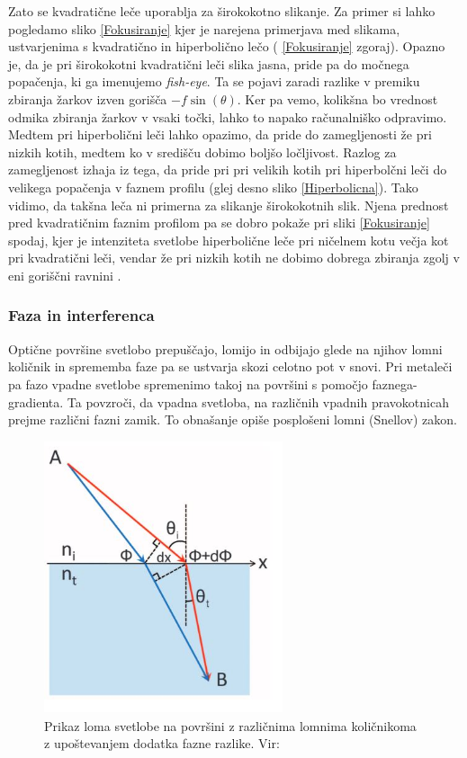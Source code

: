 \documentclass[12pt ]{article}
\begin{document}
Zato se kvadratične leče uporablja za širokokotno slikanje. Za primer si lahko pogledamo sliko \ref{Fokusiranje} kjer je narejena primerjava med slikama, ustvarjenima s kvadratično in hiperbolično lečo ( \ref{Fokusiranje} zgoraj). Opazno je, da je pri širokokotni kvadratični leči slika jasna, pride pa do močnega popačenja, ki ga imenujemo \textit{fish-eye}. Ta se pojavi zaradi razlike v premiku zbiranja žarkov izven gorišča $-f\sin(\theta)$. Ker pa vemo, kolikšna bo vrednost odmika zbiranja žarkov v vsaki točki, lahko to napako računalniško odpravimo. Medtem pri hiperbolični leči lahko opazimo, da pride do zamegljenosti že pri nizkih kotih, medtem ko v središču dobimo boljšo ločljivost. Razlog za zamegljenost izhaja iz tega, da pride pri pri velikih kotih pri hiperbolčni leči do velikega popačenja v faznem profilu (glej desno sliko \ref{Hiperbolicna}). Tako vidimo, da takšna leča ni primerna za slikanje širokokotnih slik. Njena prednost pred kvadratičnim faznim profilom pa se dobro pokaže pri sliki \ref{Fokusiranje} spodaj, kjer je intenziteta svetlobe hiperbolične leče pri ničelnem kotu večja kot pri kvadratični leči, vendar že pri nizkih kotih ne dobimo dobrega zbiranja zgolj v eni goriščni ravnini \cite{Fokusiranje}.

 



\subsubsection{Faza in interferenca}
Optične površine svetlobo prepuščajo, lomijo in odbijajo glede na njihov lomni količnik in sprememba faze pa se ustvarja skozi celotno pot v snovi. Pri metaleči pa fazo vpadne svetlobe spremenimo takoj na površini s pomočjo faznega-gradienta. Ta povzroči, da vpadna svetloba, na različnih vpadnih pravokotnicah prejme različni fazni zamik. To obnašanje opiše posplošeni lomni (Snellov) zakon. 
 \\
 
 \begin{figure}[H]
     \centering
     \includegraphics[width=7cm, height=8cm]{Slike/Sneel.JPG}
     \caption{ Prikaz loma svetlobe na površini z različnima lomnima količnikoma z upoštevanjem dodatka fazne razlike. Vir: \cite{Snell} }
     \label{Snell}
 \end{figure}
 
\end{document}
